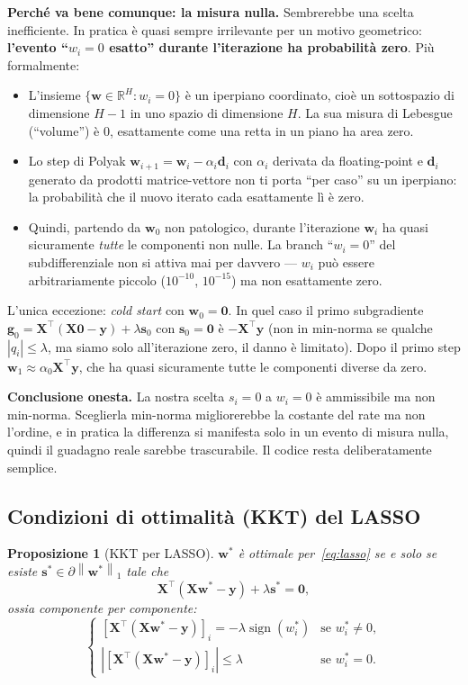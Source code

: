 \documentclass[11pt,a4paper]{article}
\newcommand{\R}{\mathbb{R}}
\newcommand{\norm}[1]{\left\|#1\right\|}
\newcommand{\bw}{\mathbf{w}}
\newcommand{\bg}{\mathbf{g}}
\newcommand{\bd}{\mathbf{d}}
\newcommand{\by}{\mathbf{y}}
\newcommand{\bX}{\mathbf{X}}
\newcommand{\bs}{\mathbf{s}}
\newcommand{\bzero}{\mathbf{0}}
\newtheorem{proposition}[theorem]{Proposizione}
\theoremstyle{definition}
\begin{document}
\begin{tcolorbox}[warning]
\smallskip
\textbf{Perché va bene comunque: la misura nulla.} Sembrerebbe una scelta inefficiente. In pratica è quasi sempre irrilevante per un motivo geometrico: \textbf{l'evento ``$w_i = 0$ esatto'' durante l'iterazione ha probabilità zero}. Più formalmente:
\begin{itemize}[leftmargin=*]
\item L'insieme $\{\bw\in\R^H : w_i = 0\}$ è un iperpiano coordinato, cioè un sottospazio di dimensione $H-1$ in uno spazio di dimensione $H$. La sua misura di Lebesgue (``volume'') è $0$, esattamente come una retta in un piano ha area zero.
\item Lo step di Polyak $\bw_{i+1} = \bw_i - \alpha_i\bd_i$ con $\alpha_i$ derivata da floating-point e $\bd_i$ generato da prodotti matrice-vettore non ti porta ``per caso'' su un iperpiano: la probabilità che il nuovo iterato cada esattamente lì è zero.
\item Quindi, partendo da $\bw_0$ non patologico, durante l'iterazione $\bw_i$ ha quasi sicuramente \emph{tutte} le componenti non nulle. La branch ``$w_i = 0$'' del subdifferenziale non si attiva mai per davvero --- $w_i$ può essere arbitrariamente piccolo ($10^{-10}$, $10^{-15}$) ma non esattamente zero.
\end{itemize}
L'unica eccezione: \emph{cold start} con $\bw_0 = \bzero$. In quel caso il primo subgradiente $\bg_0 = \bX^\top(\bX\bzero-\by) + \lambda\bs_0$ con $\bs_0 = \bzero$ è $-\bX^\top\by$ (non in min-norma se qualche $|q_i|\le\lambda$, ma siamo solo all'iterazione zero, il danno è limitato). Dopo il primo step $\bw_1 \approx \alpha_0\bX^\top\by$, che ha quasi sicuramente tutte le componenti diverse da zero.

\smallskip
\textbf{Conclusione onesta.} La nostra scelta $s_i = 0$ a $w_i = 0$ è ammissibile ma non min-norma. Sceglierla min-norma migliorerebbe la costante del rate ma non l'ordine, e in pratica la differenza si manifesta solo in un evento di misura nulla, quindi il guadagno reale sarebbe trascurabile. Il codice resta deliberatamente semplice.
\end{tcolorbox}

\subsection{Condizioni di ottimalità (KKT) del LASSO}

\begin{proposition}[KKT per LASSO]
$\bw^*$ è ottimale per~\eqref{eq:lasso} se e solo se esiste $\bs^*\in\partial\norm{\bw^*}_1$ tale che
\[
\bX^\top(\bX\bw^* - \by) + \lambda\bs^* = \bzero,
\]
ossia componente per componente:
\[
\begin{cases}
[\bX^\top(\bX\bw^*-\by)]_i = -\lambda\operatorname{sign}(w^*_i) & \text{se }w^*_i\ne 0,\\
|[\bX^\top(\bX\bw^*-\by)]_i| \le \lambda & \text{se }w^*_i = 0.
\end{cases}
\]
\end{proposition}
\end{document}
